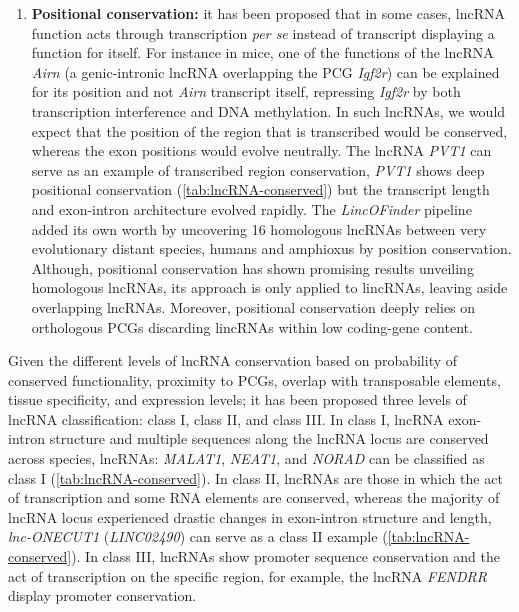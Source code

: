 \begin{enumerate}
\item \textbf{Positional conservation:} it has been proposed that in some cases, lncRNA function acts through transcription \textit{per se} instead of transcript displaying a function for itself.\autocite{kopp_2018_functional,pelechano_2013,statello_2021_lncRNA_reg} For instance in mice, one of the functions of the lncRNA \textit{Airn} (a genic-intronic lncRNA overlapping the PCG \textit{Igf2r}) can be explained for its position and not \textit{Airn} transcript itself, repressing \textit{Igf2r} by both transcription interference and DNA methylation.\autocite{pelechano_2013,schertzer_2019_airn,santoro_2013_airn} In such lncRNAs, we would expect that the position of the region that is transcribed would be conserved, whereas the exon positions would evolve neutrally. The lncRNA \textit{PVT1} can serve as an example of transcribed region conservation, \textit{PVT1} shows deep positional conservation (\autoref{tab:lncRNA-conserved}) but the transcript length and exon-intron architecture evolved rapidly.\autocite{hezroni_2015_principles} The \textit{LincOFinder} pipeline added its own worth by uncovering 16 homologous lncRNAs between very evolutionary distant species, humans and amphioxus by position conservation.\autocite{herrera_2019_microsyntenic} Although, positional conservation has shown promising results unveiling homologous lncRNAs, its approach is only applied to lincRNAs, leaving aside overlapping lncRNAs. Moreover, positional conservation deeply relies on orthologous PCGs discarding lincRNAs within low coding-gene content. 
\end{enumerate}

Given the different levels of lncRNA conservation based on probability of conserved functionality, proximity to PCGs, overlap with transposable elements, tissue specificity, and expression levels; it has been proposed three levels of lncRNA classification: class I, class II, and class III.\autocite{ulitsky_2016_evolution} In class I, lncRNA exon-intron structure and multiple sequences along the lncRNA locus are conserved across species, lncRNAs: \textit{MALAT1}, \textit{NEAT1}, and \textit{NORAD} can be classified as class I (\autoref{tab:lncRNA-conserved}). In class II, lncRNAs are those in which the act of transcription and some RNA elements are conserved, whereas the majority of lncRNA locus experienced drastic changes in exon-intron structure and length, \textit{lnc-ONECUT1} (\textit{LINC02490}) can serve as a class II example (\autoref{tab:lncRNA-conserved}). In class III, lncRNAs show promoter sequence conservation and the act of transcription on the specific region, for example, the lncRNA \textit{FENDRR} display promoter conservation. 

